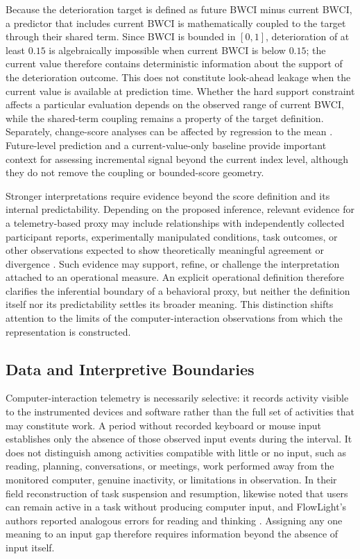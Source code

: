 Because the deterioration target is defined as future BWCI minus current BWCI, a predictor that includes current BWCI is mathematically coupled to the target through their shared term. Since BWCI is bounded in $[0,1]$, deterioration of at least $0.15$ is algebraically impossible when current BWCI is below $0.15$; the current value therefore contains deterministic information about the support of the deterioration outcome. This does not constitute look-ahead leakage when the current value is available at prediction time. Whether the hard support constraint affects a particular evaluation depends on the observed range of current BWCI, while the shared-term coupling remains a property of the target definition. Separately, change-score analyses can be affected by regression to the mean \parencite{tu2007changeInitialValue}. Future-level prediction and a current-value-only baseline provide important context for assessing incremental signal beyond the current index level, although they do not remove the coupling or bounded-score geometry.

Stronger interpretations require evidence beyond the score definition and its internal predictability. Depending on the proposed inference, relevant evidence for a telemetry-based proxy may include relationships with independently collected participant reports, experimentally manipulated conditions, task outcomes, or other observations expected to show theoretically meaningful agreement or divergence \parencite{cronbach1955constructValidity,jacobs2021measurement}. Such evidence may support, refine, or challenge the interpretation attached to an operational measure. An explicit operational definition therefore clarifies the inferential boundary of a behavioral proxy, but neither the definition itself nor its predictability settles its broader meaning. This distinction shifts attention to the limits of the computer-interaction observations from which the representation is constructed.

\subsection{Data and Interpretive Boundaries}
Computer-interaction telemetry is necessarily selective: it records activity visible to the instrumented devices and software rather than the full set of activities that may constitute work. A period without recorded keyboard or mouse input establishes only the absence of those observed input events during the interval. It does not distinguish among activities compatible with little or no input, such as reading, planning, conversations, or meetings, work performed away from the monitored computer, genuine inactivity, or limitations in observation. In their field reconstruction of task suspension and resumption, \textcite{iqbal2007taskRecovery} likewise noted that users can remain active in a task without producing computer input, and FlowLight's authors reported analogous errors for reading and thinking \parencite{zueger2017flowlight}. Assigning any one meaning to an input gap therefore requires information beyond the absence of input itself.

